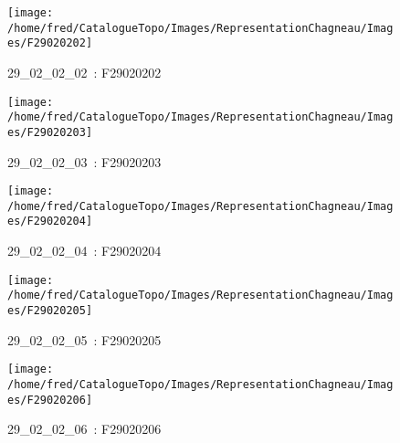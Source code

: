 \documentclass[12pt,titlepage,oneside]{book}
\begin{document}
\begin{figure}[h!]
  \hfill         %
  \begin{minipage}[t]{3cm}
    \begin{center}
      \texttt{[image: /home/fred/CatalogueTopo/Images/RepresentationChagneau/Images/F29020202]}
      \caption[~29\_02\_02\_02]{\small{29\_02\_02\_02~:} \tiny{F29020202}}\label{F29020202}
    \end{center}
  \end{minipage}
  \begin{minipage}[t]{3cm}
    \begin{center}
      \texttt{[image: /home/fred/CatalogueTopo/Images/RepresentationChagneau/Images/F29020203]}
      \caption[~29\_02\_02\_03]{\small{29\_02\_02\_03~:} \tiny{F29020203}}\label{F29020203}
    \end{center}
  \end{minipage}
  \begin{minipage}[t]{3cm}
    \begin{center}
      \texttt{[image: /home/fred/CatalogueTopo/Images/RepresentationChagneau/Images/F29020204]}
      \caption[~29\_02\_02\_04]{\small{29\_02\_02\_04~:} \tiny{F29020204}}\label{F29020204}
    \end{center}
  \end{minipage}
  \begin{minipage}[t]{3cm}
    \begin{center}
      \texttt{[image: /home/fred/CatalogueTopo/Images/RepresentationChagneau/Images/F29020205]}
      \caption[~29\_02\_02\_05]{\small{29\_02\_02\_05~:} \tiny{F29020205}}\label{F29020205}
    \end{center}
  \end{minipage}
  \begin{minipage}[t]{3cm}
    \begin{center}
      \texttt{[image: /home/fred/CatalogueTopo/Images/RepresentationChagneau/Images/F29020206]}
      \caption[~29\_02\_02\_06]{\small{29\_02\_02\_06~:} \tiny{F29020206}}\label{F29020206}
    \end{center}
  \end{minipage}
\end{figure}
\end{document}
